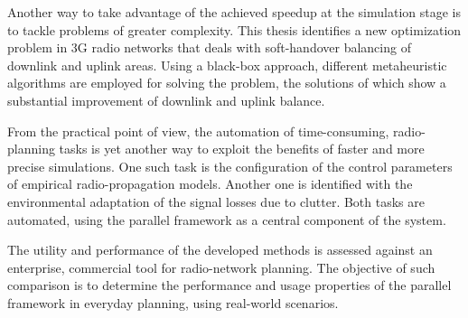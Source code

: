 Another way to take advantage of the achieved speedup at the simulation
stage is to tackle problems of greater complexity. This thesis identifies
a new optimization problem in 3G radio networks that deals with soft-handover
balancing of downlink and uplink areas. Using a black-box approach,
different metaheuristic algorithms are employed for solving the problem,
the solutions of which show a substantial improvement of downlink
and uplink balance.

From the practical point of view, the automation of time-consuming,
radio-planning tasks is yet another way to exploit the benefits of
faster and more precise simulations. One such task is the configuration
of the control parameters of empirical radio-propagation models. Another
one is identified with the environmental adaptation of the signal
losses due to clutter. Both tasks are automated, using the parallel
framework as a central component of the system.

The utility and performance of the developed methods is assessed against
an enterprise, commercial tool for radio-network planning. The objective
of such comparison is to determine the performance and usage properties
of the parallel framework in everyday planning, using real-world scenarios.


